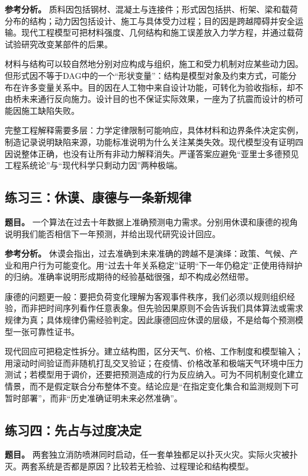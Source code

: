 \textbf{参考分析。} 质料因包括钢材、混凝土与连接件；形式因包括拱、桁架、梁和载荷分布的结构；动力因包括设计、施工与具体受力过程；目的因是跨越障碍并安全运输。现代工程模型可把材料强度、几何结构和施工误差放入力学方程，并通过载荷试验研究改变某部件的后果。

材料与结构可以较自然地分别对应构成与组织，施工和受力机制对应某些动力因。但形式因不等于DAG中的一个“形状变量”：结构是模型对象及约束方式，可能分布在许多变量关系中。目的因在人工物中来自设计功能，可转化为验收指标，却不由桥未来通行反向施力。设计目的也不保证实际效果，一座为了抗震而设计的桥可能因施工缺陷失败。

完整工程解释需要多层：力学定律限制可能响应，具体材料和边界条件决定实例，制造记录说明缺陷来源，功能标准说明为什么关注某类失效。现代模型没有证明四因说整体正确，也没有让所有非动力解释消失。严谨答案应避免“亚里士多德预见工程系统论”与“现代科学只剩动力因”两种极端。

\subsection*{练习三：休谟、康德与一条新规律}

\textbf{题目。} 一个算法在过去十年数据上准确预测电力需求。分别用休谟和康德的视角说明我们能否相信下一年预测，并给出现代研究设计回应。

\textbf{参考分析。} 休谟会指出，过去准确到未来准确的跨越不是演绎：政策、气候、产业和用户行为可能变化。用“过去十年关系稳定”证明“下一年仍稳定”正使用待辩护的归纳。准确率说明形成期待的经验基础很强，却不构成必然纽带。

康德的问题更一般：要把负荷变化理解为客观事件秩序，我们必须以规则组织经验，而非把时间序列看作任意表象。但先验因果原则不会告诉我们具体算法或需求规律为真；具体规律仍需经验判定。因此康德回应休谟的层级，不是给每个预测模型一张可靠性证书。

现代回应可把稳定性拆分。建立结构图，区分天气、价格、工作制度和模型输入；用滚动时间验证而非随机打乱交叉验证；在疫情、价格改革和极端天气环境中压力测试；若模型用于调价，还要把预测造成的行为反应纳入。可为不同机制变化建立情景，而不是假定联合分布整体不变。结论应是“在指定变化集合和监测规则下可暂时部署”，而非“历史准确证明未来必然准确”。

\subsection*{练习四：先占与过度决定}

\textbf{题目。} 两套独立消防喷淋同时启动，任一套单独都足以扑灭火灾。实际火灾被扑灭。两套系统是否都是原因？比较若无检验、过程理论和结构模型。

